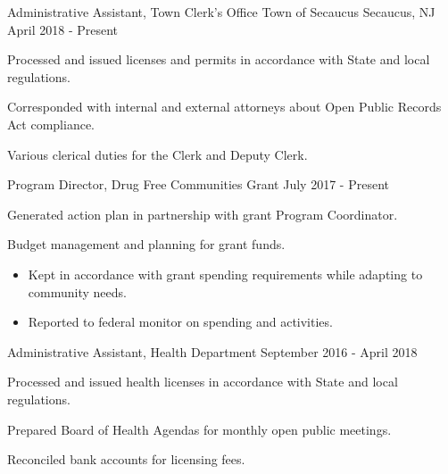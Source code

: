 

\begin{cventries}

  \cventry
    {Administrative Assistant, Town Clerk’s Office} %
    {Town of Secaucus} %
    {Secaucus, NJ} %
    {April 2018 - Present} %
    {
      \begin{cvitems} %
        \item {Processed and issued licenses and permits in accordance with State and local regulations.}
        \item {Corresponded with internal and external attorneys about Open Public Records Act compliance.}
        \item {Various clerical duties for the Clerk and Deputy Clerk.}
      \end{cvitems}
    }

  \cventry
    {Program Director, Drug Free Communities Grant} %
    {} %
    {} %
    {July 2017 - Present} %
    {
      \begin{cvitems} %
        \item {Generated action plan in partnership with grant Program Coordinator.}
        \item {Budget management and planning for grant funds.}
        \begin{itemize}
          \item {Kept in accordance with grant spending requirements while adapting to community needs.}
          \item {Reported to federal monitor on spending and activities.}
        \end{itemize}
      \end{cvitems}
    }

  \cventry
    {Administrative Assistant, Health Department} %
    {} %
    {} %
    {September 2016 - April 2018} %
    {
      \begin{cvitems} %
        \item {Processed and issued health licenses in accordance with State and local regulations.}
        \item {Prepared Board of Health Agendas for monthly open public meetings.}
        \item {Reconciled bank accounts for licensing fees.}
      \end{cvitems}
    }


\end{cventries}
